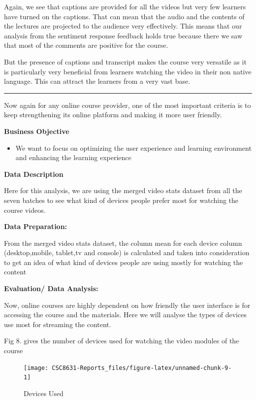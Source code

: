 \documentclass[
]{article}
\providecommand{\tightlist}{%
  \setlength{\itemsep}{0pt}\setlength{\parskip}{0pt}}
\begin{document}
Again, we see that captions are provided for all the videos but very few
learners have turned on the captions. That can mean that the audio and
the contents of the lectures are projected to the audience very
effectively. This means that our analysis from the sentiment response
feedback holds true because there we saw that most of the comments are
positive for the course.

But the presence of captions and transcript makes the course very
versatile as it is particularly very beneficial from learners watching
the video in their non native language. This can attract the learners
from a very vast base.

\begin{center}\rule{0.5\linewidth}{0.5pt}\end{center}

Now again for any online course provider, one of the most important
criteria is to keep strengthening its online platform and making it more
user friendly.

\textbf{Business Objective }

\begin{itemize}
\tightlist
\item
  We want to focus on optimizing the user experience and learning
  environment and enhancing the learning experience
\end{itemize}

\textbf{Data Description }

Here for this analysis, we are using the merged video stats dataset from
all the seven batches to see what kind of devices people prefer most for
watching the course videos.

\textbf{Data Preparation: }

From the merged video stats dataset, the column mean for each device
column (desktop,mobile, tablet,tv and console) is calculated and taken
into consideration to get an idea of what kind of devices people are
using mostly for watching the content

\textbf{Evaluation/ Data Analysis:}

Now, online courses are highly dependent on how friendly the user
interface is for accessing the course and the materials. Here we will
analyse the types of devices use most for streaming the content.

Fig 8. gives the number of devices used for watching the video modules
of the course

\begin{figure}
\texttt{[image: CSC8631-Reports\_files/figure-latex/unnamed-chunk-9-1]} \caption{Devices Used}\label{fig:unnamed-chunk-9}
\end{figure}
\end{document}
